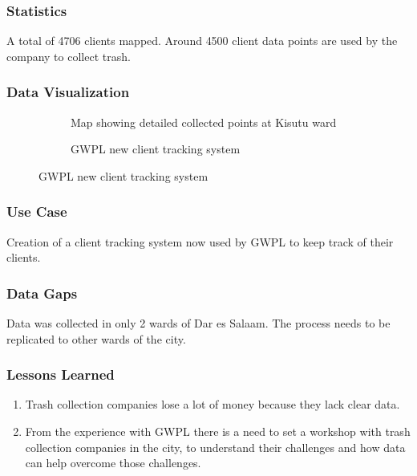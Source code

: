 \documentclass[a4paper,12pt,twoside]{article}
\begin{document}
\subsubsection{Statistics}
A total of 4706 clients mapped.
Around 4500 client data points are used by the company to collect trash.


\subsubsection{Data Visualization}

\begin{figure}
  \begin{subfigure}[b]{0.4\textwidth}
   \color{RHgreen}\caption{Map showing detailed collected points at Kisutu ward}
    \label{fig:1}
  \end{subfigure}
  \begin{subfigure}[b]{0.5\textwidth}
    \color{RHgreen}\caption{GWPL new client tracking system}
    \label{fig:2}
  \end{subfigure}
\end{figure}

\subsubsection{Use Case}
Creation of a client tracking system now used by GWPL to keep track of their clients.

\subsubsection{Data Gaps}
Data was collected in only 2 wards of Dar es Salaam. The process needs to be replicated to other wards of the city.

\subsubsection{Lessons Learned}
\begin{enumerate}
    \item Trash collection companies lose a lot of money because they lack clear data.

    \item From the experience with GWPL there is a need to set a workshop with trash collection companies in the city, to understand their challenges and how data can help overcome those challenges.
\end{enumerate}
\end{document}
